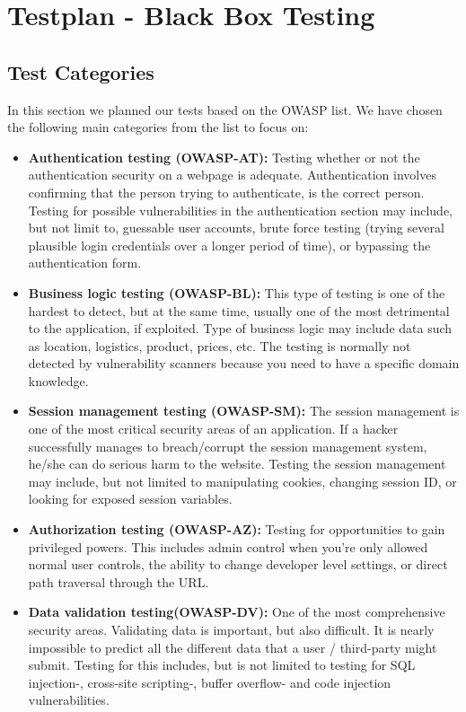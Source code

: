 \clearpage
\section{Testplan - Black Box Testing}

\subsection{Test Categories}
In this section we planned our tests based on the OWASP list. We have chosen the following main categories from the list to focus on:
\begin{itemize}
	\item {\bf Authentication testing (OWASP-AT):} Testing whether or not the authentication security on a webpage is adequate. Authentication involves confirming that the person trying to authenticate, is the correct person. Testing for possible vulnerabilities in the authentication section may include, but not limit to, guessable user accounts, brute force testing (trying several plausible login credentials over a longer period of time), or bypassing the authentication form.
	\item {\bf Business logic testing (OWASP-BL):} This type of testing is one of the hardest to detect, but at the same time, usually one of the most detrimental to the application, if exploited. Type of business logic may include data such as location, logistics, product, prices, etc. The testing is normally not detected by vulnerability scanners because you need to have a specific domain knowledge.
	\item {\bf Session management testing (OWASP-SM):} The session management is one of the most critical security areas of an application. If a hacker successfully manages to breach/corrupt the session management system, he/she can do serious harm to the website. Testing the session management may include, but not limited to manipulating cookies, changing session ID, or looking for exposed session variables.
	\item {\bf Authorization testing (OWASP-AZ):} Testing for opportunities to gain privileged powers. This includes admin control when you’re only allowed normal user controls, the ability to change developer level settings, or direct path traversal through the URL.
	\item {\bf Data validation testing(OWASP-DV):} One of the most comprehensive security areas. Validating data is important, but also difficult. It is nearly impossible to predict all the different data that a user / third-party might submit. Testing for this includes, but is not limited to testing for SQL injection-, cross-site scripting-, buffer overflow- and code injection vulnerabilities.

\end{itemize}

